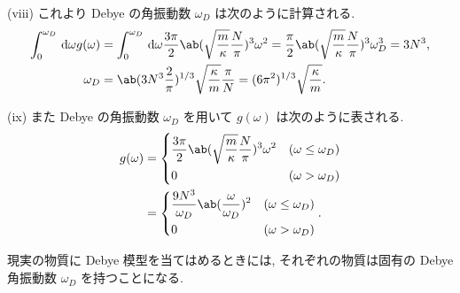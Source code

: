 \documentclass[uplatex,diffipdfmx,a4paper,11pt]{jlreq}
\theoremstyle{definition}
\begin{document}
(viii) これより Debye の角振動数 $\omega_D$ は次のように計算される.
\begin{align}
  \int_0^{\omega_D}\dl{\omega}g(\omega) & = \int_0^{\omega_D}\dl{\omega}\frac{3\pi}{2}\ab(\sqrt{\frac{m}{\kappa}}\frac{N}{\pi})^3\omega^2 = \frac{\pi}{2}\ab(\sqrt{\frac{m}{\kappa}}\frac{N}{\pi})^3\omega_D^3 = 3N^3, \\
  \omega_D                              & = \ab(3N^3\frac{2}{\pi})^{1/3}\sqrt{\frac{\kappa}{m}}\frac{\pi}{N} = (6\pi^2)^{1/3}\sqrt{\frac{\kappa}{m}}.
\end{align}

(ix) また Debye の角振動数 $\omega_D$ を用いて $g(\omega)$ は次のように表される.
\begin{align}
  g(\omega) & = \begin{dcases}
                  \frac{3\pi}{2}\ab(\sqrt{\frac{m}{\kappa}}\frac{N}{\pi})^3\omega^2 & (\omega\leq\omega_D) \\
                  0                                                                 & (\omega > \omega_D)
                \end{dcases} \\
            & = \begin{dcases}
                  \frac{9N^3}{\omega_D}\ab(\frac{\omega}{\omega_D})^2 & (\omega\leq\omega_D) \\
                  0                                                   & (\omega > \omega_D)
                \end{dcases}.
\end{align}

現実の物質に Debye 模型を当てはめるときには, それぞれの物質は固有の Debye 角振動数 $\omega_D$ を持つことになる.
\end{document}
